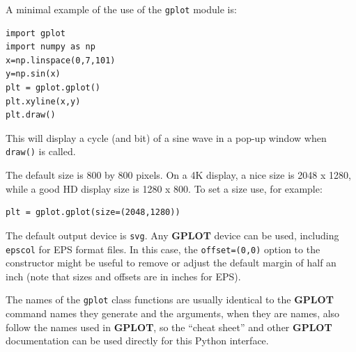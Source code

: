 \documentclass[a4paper,twoside,11pt]{article}
\newcommand{\newpara}{\par\vspace{4mm}\noindent}
\begin{document}
\newpara
A minimal example of the use of the \texttt{gplot} module is:
\begin{lstlisting}
import gplot
import numpy as np
x=np.linspace(0,7,101)
y=np.sin(x)
plt = gplot.gplot()
plt.xyline(x,y)
plt.draw()
\end{lstlisting}

\newpara
This will display a cycle (and bit) of a sine wave in a pop-up window when \texttt{draw()} is called.

\newpara
The default size is 800 by 800 pixels. On a 4K display, a nice size is 2048 x 1280, while a good HD display size
is 1280 x 800. To set a size use, for example:
\begin{lstlisting}
plt = gplot.gplot(size=(2048,1280))
\end{lstlisting}

\newpara
The default output device is \texttt{svg}. Any \textbf{GPLOT} device can be used,
including \texttt{epscol} for EPS format files. In this case,
the \texttt{offset=(0,0)} option to the constructor might be useful to remove or adjust the default
margin of half an inch (note that sizes and offsets are in inches for EPS).

\newpara
The names of the \texttt{gplot} class functions are usually identical to the \textbf{GPLOT} command names they generate
and the arguments, when they are names, also follow the names used in \textbf{GPLOT}, so the ``cheat sheet'' and other
\textbf{GPLOT} documentation can be used directly for this Python interface.
\end{document}
